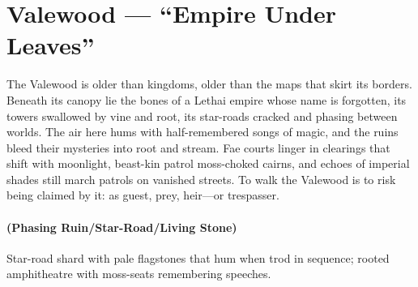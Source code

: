 \section{Valewood --- ``Empire Under Leaves''}
\label{chap:valewood}

\begin{tcolorbox}[colback=black!3,colframe=black!40!white,title={Theme \& Atmosphere}]
The Valewood is older than kingdoms, older than the maps that skirt its borders. Beneath its canopy lie the bones of a Lethai empire whose name is forgotten, its towers swallowed by vine and root, its star-roads cracked and phasing between worlds. The air here hums with half-remembered songs of magic, and the ruins bleed their mysteries into root and stream. Fae courts linger in clearings that shift with moonlight, beast-kin patrol moss-choked cairns, and echoes of imperial shades still march patrols on vanished streets. To walk the Valewood is to risk being claimed by it: as guest, prey, heir—or trespasser.
\end{tcolorbox}

\paragraph*{(Phasing Ruin/Star-Road/Living Stone)} Star-road shard with pale flagstones that hum when trod in sequence; rooted amphitheatre with moss-seats remembering speeches.

